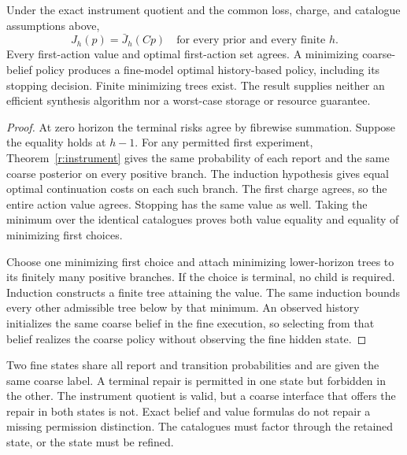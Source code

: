 \begin{theorem}\label{r:belief-planning}
Under the exact instrument quotient and the common loss, charge, and catalogue assumptions above,
\[
 J_h(p)=\bar J_h(Cp)\quad\text{for every prior and every finite }h.
\]
Every first-action value and optimal first-action set agrees. A minimizing coarse-belief policy produces a fine-model optimal history-based policy, including its stopping decision. Finite minimizing trees exist. The result supplies neither an efficient synthesis algorithm nor a worst-case storage or resource guarantee.
\end{theorem}
\begin{proof}
At zero horizon the terminal risks agree by fibrewise summation. Suppose the equality holds at $h-1$. For any permitted first experiment, Theorem~\ref{r:instrument} gives the same probability of each report and the same coarse posterior on every positive branch. The induction hypothesis gives equal optimal continuation costs on each such branch. The first charge agrees, so the entire action value agrees. Stopping has the same value as well. Taking the minimum over the identical catalogues proves both value equality and equality of minimizing first choices.

Choose one minimizing first choice and attach minimizing lower-horizon trees to its finitely many positive branches. If the choice is terminal, no child is required. Induction constructs a finite tree attaining the value. The same induction bounds every other admissible tree below by that minimum. An observed history initializes the same coarse belief in the fine execution, so selecting from that belief realizes the coarse policy without observing the fine hidden state.
\end{proof}

\begin{counterexample}\label{ce:permission-loss}
Two fine states share all report and transition probabilities and are given the same coarse label. A terminal repair is permitted in one state but forbidden in the other. The instrument quotient is valid, but a coarse interface that offers the repair in both states is not. Exact belief and value formulas do not repair a missing permission distinction. The catalogues must factor through the retained state, or the state must be refined.
\end{counterexample}

